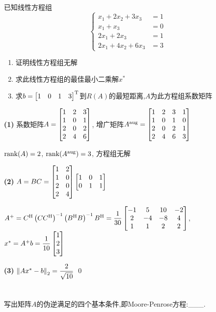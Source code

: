\documentclass{matrix-homework}
\begin{document}
\newpage
\section{}
已知线性方程组
\begin{equation*}
    \left\{
    \begin{aligned}
        x_1+2x_2+3x_3  & =1  \\
        x_1+x_3        & = 0 \\
        2x_1 +2x_3     & =1  \\
        2x_1+4x_2+6x_3 & =3
    \end{aligned}
    \right.
\end{equation*}
\begin{enumerate}[label=(\arabic*)]
    \item 证明线性方程组无解
    \item 求此线性方程组的最佳最小二乘解$x^*$
    \item 求$b=\begin{bmatrix}1&0&1&3\end{bmatrix}^{\mathrm{T}}$到$R(A)$的最短距离,$A$为此方程组系数矩阵
\end{enumerate}
\answer
\textbf{(1)} 系数矩阵$A=\begin{bmatrix}1&2&3\\1&0&1\\2&0&2\\2&4&6\end{bmatrix}$, 增广矩阵$A^{\text{aug}}=\begin{bmatrix}1&2&3&1\\1&0&1&0\\2&0&2&1\\2&4&6&3\end{bmatrix}$

$\mathrm{rank}(A)=2$, $\mathrm{rank}(A^{\text{aug}})=3$, 方程组无解

\textbf{(2)} $A=BC=\begin{bmatrix}1&2\\1&0\\2&0\\2&4\end{bmatrix}\begin{bmatrix}1&0&1\\0&1&1\end{bmatrix}$

$A^+=C^{\mathrm{H}}\left(CC^{\mathrm{H}}\right)^{-1}\left(B^{\mathrm{H}} B\right)^{-1}B^{\mathrm{H}} = \dfrac{1}{30}\begin{bmatrix}-1&5&10&-2\\2&-4&-8&4\\1&1&2&2\end{bmatrix}$, $x^*=A^+b=\dfrac{1}{10}\begin{bmatrix}1\\2\\3\end{bmatrix}$

\textbf{(3)} $\left\lVert Ax^*-b \right\rVert_2=\dfrac{2}{\sqrt{10}}$
\qed

\section{}
写出矩阵$A$的伪逆满足的四个基本条件,即Moore-Penrose方程:\_\_\_.
\end{document}
